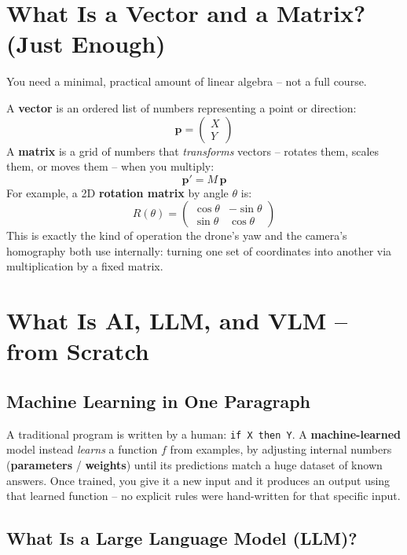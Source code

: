 \documentclass[11pt,a4paper]{article}
\begin{document}
\section{What Is a Vector and a Matrix? (Just Enough)}

You need a minimal, practical amount of linear algebra -- not a full course.

\begin{mathbox}
A \textbf{vector} is an ordered list of numbers representing a point or direction:
\[
\mathbf{p} = \begin{pmatrix} X \\ Y \end{pmatrix}
\]
A \textbf{matrix} is a grid of numbers that \emph{transforms} vectors -- rotates them, scales
them, or moves them -- when you multiply:
\[
\mathbf{p}' = M\,\mathbf{p}
\]
For example, a 2D \textbf{rotation matrix} by angle $\theta$ is:
\[
R(\theta) = \begin{pmatrix} \cos\theta & -\sin\theta \\ \sin\theta & \cos\theta \end{pmatrix}
\]
This is exactly the kind of operation the drone's yaw and the camera's homography both use
internally: turning one set of coordinates into another via multiplication by a fixed matrix.
\end{mathbox}

\section{What Is AI, LLM, and VLM -- from Scratch}

\subsection{Machine Learning in One Paragraph}

A traditional program is written by a human: \texttt{if X then Y}. A \textbf{machine-learned}
model instead \emph{learns} a function $f$ from examples, by adjusting internal numbers
(\textbf{parameters} / \textbf{weights}) until its predictions match a huge dataset of known
answers. Once trained, you give it a new input and it produces an output using that learned
function -- no explicit rules were hand-written for that specific input.

\subsection{What Is a Large Language Model (LLM)?}
\end{document}

